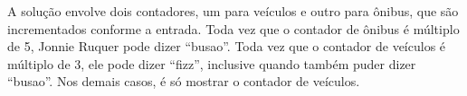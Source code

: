 A solução envolve dois contadores, um para veículos e outro para ônibus, que são incrementados conforme a entrada. Toda vez que o contador de ônibus é múltiplo de 5, Jonnie Ruquer pode dizer ``busao''. Toda vez que o contador de veículos é múltiplo de 3, ele pode dizer ``fizz'', inclusive quando também puder dizer ``busao''. Nos demais casos, é só mostrar o contador de veículos.
